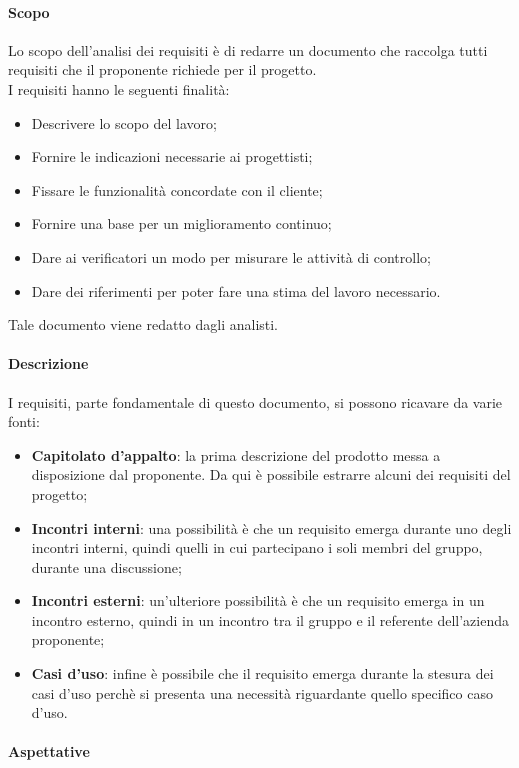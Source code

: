 \documentclass[../norme-di-progetto.tex]{subfiles}
\begin{document}
\paragraph{Scopo}
Lo scopo dell'analisi dei requisiti è di redarre un documento che raccolga tutti requisiti che il proponente richiede per il progetto.\\
I requisiti hanno le seguenti finalità:
\begin{itemize}
    \item Descrivere lo scopo del lavoro;
    \item Fornire le indicazioni necessarie ai progettisti;
    \item Fissare le funzionalità concordate con il cliente;
    \item Fornire una base per un miglioramento continuo;
    \item Dare ai verificatori un modo per misurare le attività di controllo;
    \item Dare dei riferimenti per poter fare una stima del lavoro necessario.
\end{itemize}
Tale documento viene redatto dagli analisti.

\paragraph{Descrizione}
I requisiti, parte fondamentale di questo documento, si possono ricavare da varie fonti:
\begin{itemize}
    \item \textbf{Capitolato d'appalto}: la prima descrizione del prodotto messa a disposizione dal proponente. Da qui è possibile estrarre alcuni dei requisiti del progetto;
    \item \textbf{Incontri interni}: una possibilità è che un requisito emerga durante uno degli incontri interni, quindi quelli in cui partecipano i soli membri del gruppo, durante una discussione;
    \item \textbf{Incontri esterni}: un'ulteriore possibilità è che un requisito emerga in un incontro esterno, quindi in un incontro tra il gruppo e il referente dell'azienda proponente;
    \item \textbf{Casi d'uso}: infine è possibile che il requisito emerga durante la stesura dei casi d'uso perchè si presenta una necessità riguardante quello specifico caso d'uso.
\end{itemize}

\paragraph{Aspettative}
\end{document}

